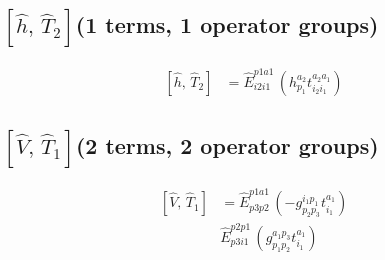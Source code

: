 \documentclass[11pt]{article}
\begin{document}
\subsection*{$\left[\hat{h},\, \hat{T}_{2}\right]$\quad(1 terms, 1 operator groups)}
\begin{align}
\left[\hat{h},\, \hat{T}_{2}\right] &= \hat{E}^{p1a1}_{i2i1}\,\left(h^{a_{2}}_{p_{1}} t^{a_{2}a_{1}}_{i_{2}i_{1}} \right)
\end{align}
\subsection*{$\left[\hat{V},\, \hat{T}_{1}\right]$\quad(2 terms, 2 operator groups)}
\begin{align}
\left[\hat{V},\, \hat{T}_{1}\right] &= \hat{E}^{p1a1}_{p3p2}\,\left(- g^{i_{1}p_{1}}_{p_{2}p_{3}} t^{a_{1}}_{i_{1}} \right) \\
&\hat{E}^{p2p1}_{p3i1}\,\left(g^{a_{1}p_{3}}_{p_{1}p_{2}} t^{a_{1}}_{i_{1}} \right)
\end{align}
\end{document}
